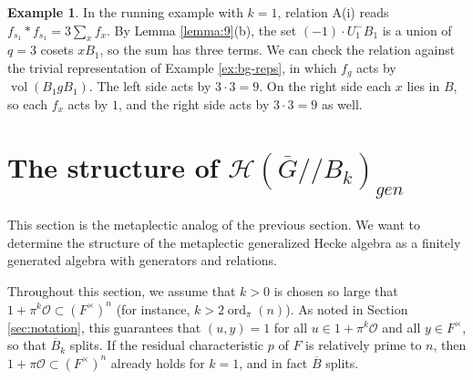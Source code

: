 \documentclass[12pt,letterpaper,reqno]{amsart}
\let\cal\mathcal
\theoremstyle{definition}
\newtheorem{example}[theorem]{Example}
\theoremstyle{remark}
\numberwithin{equation}{section}
\begin{document}
\begin{example}
\label{ex:prop-main}
In the running example with $k=1$, relation A(i) reads
$f_{s_1}*f_{s_1}=3\sum_x f_x$. By Lemma \ref{lemma:9}(b), the set
$(-1)\cdot U_1^-B_1$ is a union of $q=3$ cosets $xB_1$, so the sum has three
terms. We can check the relation against the trivial representation of Example
\ref{ex:bg-reps}, in which $f_g$ acts by $\operatorname{vol}(B_1gB_1)$. The
left side acts by $3\cdot 3=9$. On the right side each $x$ lies in $B$, so
each $f_x$ acts by $1$, and the right side acts by $3\cdot 3=9$ as well.
\end{example}

\section{The structure of ${\cal H}(\overline{G}//B_k)_{gen}$}
\label{section:metaplectic}

This section is the metaplectic analog of the previous section. We want to
determine the structure of the metaplectic generalized Hecke algebra as a
finitely generated algebra with generators and relations.

Throughout this section, we assume that $k>0$ is chosen so large that
$1+\pi^k{\cal O}\subset (F^\times)^n$ (for instance,
$k>2\operatorname{ord}_\pi(n)$). As noted in Section \ref{sec:notation},
this guarantees that
$(u,y)=1$ for all $u\in 1+\pi^k{\cal O}$ and all $y\in F^\times$, so that
$\overline{B}_k$ splits. If the residual characteristic $p$ of $F$ is
relatively prime to $n$, then $1+\pi{\cal O}\subset (F^\times)^n$ already holds
for $k=1$, and in fact $\overline{B}$ splits.
\end{document}
